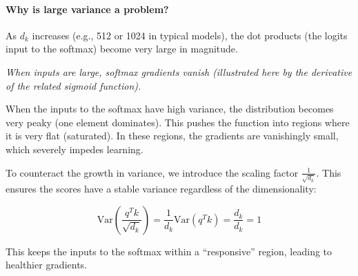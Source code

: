 \documentclass{article}
\begin{document}
\paragraph{Why is large variance a problem?}
As $d_k$ increases (e.g., 512 or 1024 in typical models), the dot products (the logits input to the softmax) become very large in magnitude.

\begin{center}
\end{center}

\begin{center}
\textit{When inputs are large, softmax gradients vanish (illustrated here by the derivative of the related sigmoid function).}
\end{center}

When the inputs to the softmax have high variance, the distribution becomes very peaky (one element dominates). This pushes the function into regions where it is very flat (saturated). In these regions, the gradients are vanishingly small, which severely impedes learning.

\begin{tcolorbox}[colback=yellow!5!white, colframe=orange!50!black, title={The Scaling Solution (Vaswani et al., 2017)}]
To counteract the growth in variance, we introduce the scaling factor $\frac{1}{\sqrt{d_k}}$. This ensures the scores have a stable variance regardless of the dimensionality:

\begin{equation}
\text{Var}\left(\frac{q^T k}{\sqrt{d_k}}\right) = \frac{1}{d_k} \text{Var}(q^T k) = \frac{d_k}{d_k} = 1
\end{equation}

This keeps the inputs to the softmax within a ``responsive'' region, leading to healthier gradients.
\end{tcolorbox}
\end{document}
